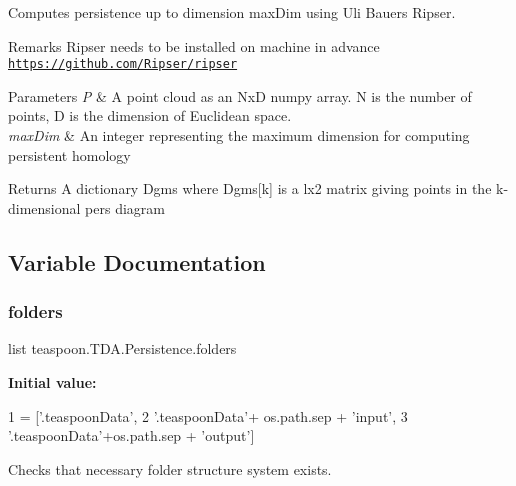Computes persistence up to dimension max\+Dim using Uli Bauer\textquotesingle{}s Ripser.

\begin{DoxyRemark}{Remarks}
Ripser needs to be installed on machine in advance \href{https://github.com/Ripser/ripser}{\tt https\+://github.\+com/\+Ripser/ripser}
\end{DoxyRemark}

\begin{DoxyParams}{Parameters}
{\em P} & A point cloud as an NxD numpy array. N is the number of points, D is the dimension of Euclidean space. \\
\hline
{\em max\+Dim} & An integer representing the maximum dimension for computing persistent homology\\
\hline
\end{DoxyParams}
\begin{DoxyReturn}{Returns}
A dictionary Dgms where Dgms\mbox{[}k\mbox{]} is a lx2 matrix giving points in the k-\/dimensional pers diagram
\end{DoxyReturn}


\subsection{Variable Documentation}
\mbox{\label{namespaceteaspoon_1_1_t_d_a_1_1_persistence_a5d89c08933153d3fea60fd71e9e16800}}
\subsubsection{\texorpdfstring{folders}{folders}}
{\footnotesize\ttfamily list teaspoon.\+T\+D\+A.\+Persistence.\+folders}

{\bfseries Initial value\+:}
\begin{DoxyCode}
1 =  [\textcolor{stringliteral}{'.teaspoonData'},
2                \textcolor{stringliteral}{'.teaspoonData'}+ os.path.sep + \textcolor{stringliteral}{'input'},
3                \textcolor{stringliteral}{'.teaspoonData'}+os.path.sep + \textcolor{stringliteral}{'output'}]
\end{DoxyCode}


Checks that necessary folder structure system exists.

